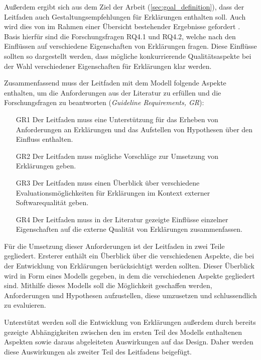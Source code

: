 
Außerdem ergibt sich aus dem Ziel der Arbeit (\autoref{sec:goal_definition}), dass der Leitfaden auch Gestaltungsempfehlungen für Erklärungen enthalten soll. Auch wird dies von \citeauthor{waa_evaluating_2021} im Rahmen einer Übersicht bestehender Ergebnisse gefordert \cite{waa_evaluating_2021}. Basis hierfür sind die Forschungsfragen RQ4.1 und RQ4.2, welche nach den Einflüssen auf verschiedene Eigenschaften von Erklärungen fragen. Diese Einflüsse sollten so dargestellt werden, dass mögliche konkurrierende Qualitätsaspekte bei der Wahl verschiedener Eigenschaften für Erklärungen klar werden.

\smallskip

Zusammenfassend muss der Leitfaden mit dem Modell folgende Aspekte enthalten, um die Anforderungen aus der Literatur zu erfüllen und die Forschungsfragen zu beantworten (\textit{Guideline Requirements, GR}):

\begin{enumerate}
    \item[GR1] Der Leitfaden muss eine Unterstützung für das Erheben von Anforderungen an Erklärungen und das Aufstellen von Hypothesen über den Einfluss enthalten.
    \item[GR2] Der Leitfaden muss mögliche Vorschläge zur Umsetzung von Erklärungen geben.
    \item[GR3] Der Leitfaden muss einen Überblick über verschiedene Evaluationsmöglichkeiten für Erklärungen im Kontext externer Softwarequalität geben.
    \item[GR4] Der Leitfaden muss in der Literatur gezeigte Einflüsse einzelner Eigenschaften auf die externe Qualität von Erklärungen zusammenfassen.
\end{enumerate}

\bigskip

Für die Umsetzung dieser Anforderungen ist der Leitfaden in zwei Teile gegliedert. Ersterer enthält ein Überblick über die verschiedenen Aspekte, die bei der Entwicklung von Erklärungen berücksichtigt werden sollten. Dieser Überblick wird in Form eines Modells gegeben, in dem die verschiedenen Aspekte gegliedert sind. Mithilfe dieses Modells soll die Möglichkeit geschaffen werden, Anforderungen und Hypothesen aufzustellen, diese umzusetzen und schlussendlich zu evaluieren.

Unterstützt werden soll die Entwicklung von Erklärungen außerdem durch bereits gezeigte Abhängigkeiten zwischen den im ersten Teil des Modells enthaltenen Aspekten sowie daraus abgeleiteten Auswirkungen auf das Design. Daher werden diese Auswirkungen als zweiter Teil des Leitfadens beigefügt.

